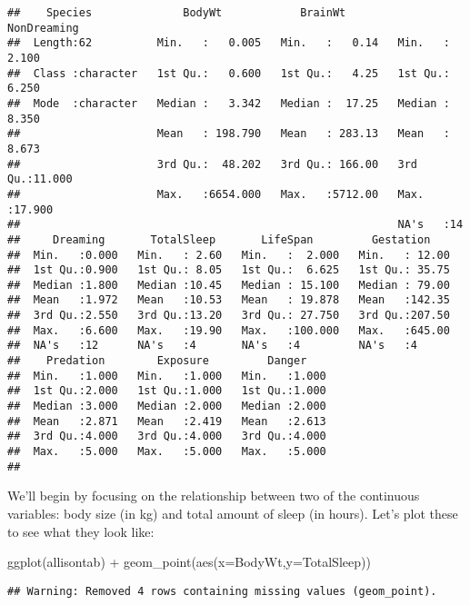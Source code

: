 \documentclass[
]{book}
\newenvironment{Shaded}{\begin{snugshade}}{\end{snugshade}}
\newcommand{\AttributeTok}[1]{\textcolor[rgb]{0.77,0.63,0.00}{#1}}
\newcommand{\FunctionTok}[1]{\textcolor[rgb]{0.00,0.00,0.00}{#1}}
\newcommand{\NormalTok}[1]{#1}
\newcommand{\SpecialCharTok}[1]{\textcolor[rgb]{0.00,0.00,0.00}{#1}}
\begin{document}
\begin{verbatim}
##    Species              BodyWt            BrainWt         NonDreaming    
##  Length:62          Min.   :   0.005   Min.   :   0.14   Min.   : 2.100  
##  Class :character   1st Qu.:   0.600   1st Qu.:   4.25   1st Qu.: 6.250  
##  Mode  :character   Median :   3.342   Median :  17.25   Median : 8.350  
##                     Mean   : 198.790   Mean   : 283.13   Mean   : 8.673  
##                     3rd Qu.:  48.202   3rd Qu.: 166.00   3rd Qu.:11.000  
##                     Max.   :6654.000   Max.   :5712.00   Max.   :17.900  
##                                                          NA's   :14      
##     Dreaming       TotalSleep       LifeSpan         Gestation     
##  Min.   :0.000   Min.   : 2.60   Min.   :  2.000   Min.   : 12.00  
##  1st Qu.:0.900   1st Qu.: 8.05   1st Qu.:  6.625   1st Qu.: 35.75  
##  Median :1.800   Median :10.45   Median : 15.100   Median : 79.00  
##  Mean   :1.972   Mean   :10.53   Mean   : 19.878   Mean   :142.35  
##  3rd Qu.:2.550   3rd Qu.:13.20   3rd Qu.: 27.750   3rd Qu.:207.50  
##  Max.   :6.600   Max.   :19.90   Max.   :100.000   Max.   :645.00  
##  NA's   :12      NA's   :4       NA's   :4         NA's   :4       
##    Predation        Exposure         Danger     
##  Min.   :1.000   Min.   :1.000   Min.   :1.000  
##  1st Qu.:2.000   1st Qu.:1.000   1st Qu.:1.000  
##  Median :3.000   Median :2.000   Median :2.000  
##  Mean   :2.871   Mean   :2.419   Mean   :2.613  
##  3rd Qu.:4.000   3rd Qu.:4.000   3rd Qu.:4.000  
##  Max.   :5.000   Max.   :5.000   Max.   :5.000  
## 
\end{verbatim}

We'll begin by focusing on the relationship between two of the continuous variables: body size (in kg) and total amount of sleep (in hours). Let's plot these to see what they look like:

\begin{Shaded}
\begin{Highlighting}[]
\FunctionTok{ggplot}\NormalTok{(allisontab) }\SpecialCharTok{+} \FunctionTok{geom\_point}\NormalTok{(}\FunctionTok{aes}\NormalTok{(}\AttributeTok{x=}\NormalTok{BodyWt,}\AttributeTok{y=}\NormalTok{TotalSleep))}
\end{Highlighting}
\end{Shaded}

\begin{verbatim}
## Warning: Removed 4 rows containing missing values (geom_point).
\end{verbatim}
\end{document}
